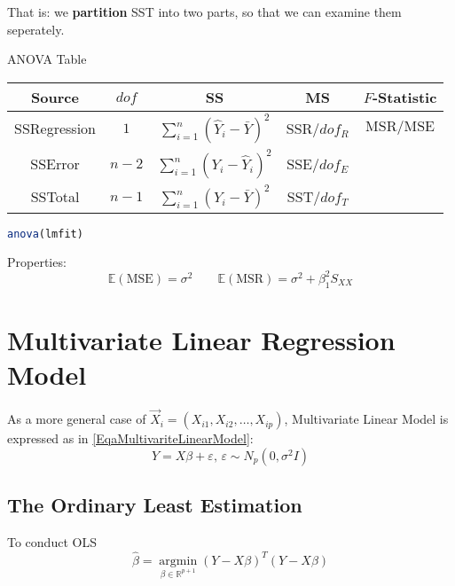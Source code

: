     That is: we \textbf{partition} SST into two parts, so that we can examine them seperately.
    

    \begin{point}
        ANOVA Table
    \end{point}
    
        \begin{table}[H]
            \centering
            \renewcommand\arraystretch{1}
            \begin{tabular}{c|cccc}
                \hline
                Source&$ dof $&SS&MS&$ F $-Statistic\\\hline
                SSRegression&$ 1 $&$ \sum_{i=1}^n(\hat{Y}_i-\bar{Y})^2  $&SSR/$ dof_R $& $ \mathrm{MSR}/\mathrm{MSE} $\\
                SSError&$ n-2 $&$ \sum_{i=1}^n(Y_i-\hat{Y}_i)^2  $&SSE/$ dof_E $& \\
                SSTotal&$ n-1 $&$ \sum_{i=1}^n(Y_i-\bar{Y})^2  $&SST/$ dof_T $& \\
                \hline
            \end{tabular}
        \end{table}
    \begin{rcode}
\begin{lstlisting}[language=R]
anova(lmfit)
\end{lstlisting}
    \end{rcode}    





Properties:
\begin{equation}
    \mathbb{E}(\mathrm{MSE})=\sigma ^2\qquad \mathbb{E}(\mathrm{MSR})=\sigma ^2+\beta _1^2S_{XX} 
\end{equation}



\section{Multivariate Linear Regression Model}\label{SubSectionMultivariateLinearRegressionModel}
    As a more general case of $ \vec{X}_i=(X_{i1},X_{i2},\ldots,X_{ip})  $, Multivariate Linear Model is expressed as in \autoref{EqaMultivariteLinearModel}:
    \begin{equation}
        Y=X\beta +\varepsilon ,\,\varepsilon \sim N_p(0,\sigma ^2I) 
    \end{equation}


\subsection{The Ordinary Least Estimation}
    To conduct OLS
    \begin{equation}
        \hat{\beta }=\mathop{ \arg\min }\limits_{\beta \in \mathbb{R}^{p+1} } (Y-X\beta )^T(Y-X\beta )
    \end{equation}
    
